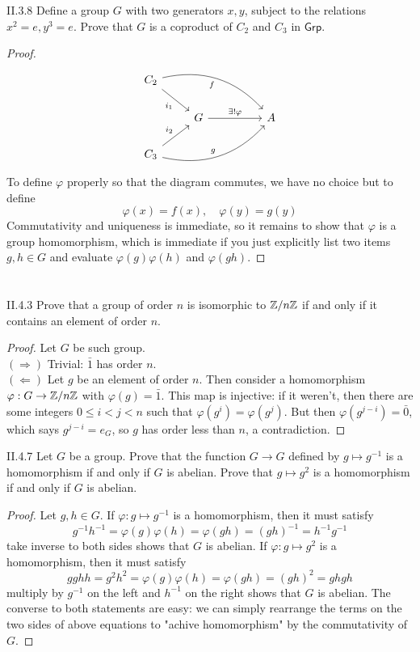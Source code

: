 \begin{problem}{II.3.8}
Define a group $G$ with two generators $x,y$, subject to the relations $x^2 = e, y^3 = e$. Prove that $G$ is a coproduct of $C_2$ and $C_3$ in $\mathsf{Grp}$.
\end{problem}
\begin{proof}
\[
\begin{tikzcd}
C_2 \arrow[rrrd, "f"', bend left] \arrow[rd, "i_1"'] &    &  &   \\
& G \arrow[rr, "\exists!\varphi"] &  & A \\
C_3 \arrow[rrru, "g", bend right] \arrow[ru, "i_2"]  &  &  &  
\end{tikzcd}
\]
To define $\varphi$ properly so that the diagram commutes, we have no choice but to define
\[
\varphi(x) = f(x), \quad \varphi(y) = g(y)
\]
Commutativity and uniqueness is immediate, so it remains to show that $\varphi$ is a group homomorphism, which is immediate if you just explicitly list two items $g,h \in G$ and evaluate $\varphi(g)\varphi(h)$ and $\varphi(gh)$.
\end{proof}

\section{}

\begin{problem}{II.4.3}
Prove that a group of order $n$ is isomorphic to $\mathbb{Z}/n\mathbb{Z}$ if and only if it contains an element of order $n$.
\end{problem}
\begin{proof}
Let $G$ be such group. \\
$(\Rightarrow)$ Trivial: $\bar{1}$ has order $n$. \\
$(\Leftarrow)$ Let $g$ be an element of order $n$. Then consider a homomorphism $\varphi: G \to \mathbb{Z}/n\mathbb{Z}$ with $\varphi(g) = \bar{1}$. This map is injective: if it weren't, then there are some integers $0 \leq i < j < n$ such that $\varphi(g^i) = \varphi(g^j)$. But then $\varphi(g^{j-i}) = \bar{0}$, which says $g^{j-i} = e_G$, so $g$ has order less than $n$, a contradiction.
\end{proof}

\begin{problem}{II.4.7}
Let $G$ be a group. Prove that the function $G \to G$ defined by $g \mapsto g^{-1}$ is a homomorphism if and only if $G$ is abelian. Prove that $g \mapsto g^2$ is a homomorphism if and only if $G$ is abelian.
\end{problem}
\begin{proof}
Let $g,h \in G$. If $\varphi: g \mapsto g^{-1}$ is a homomorphism, then it must satisfy
\[
g^{-1}h^{-1} = \varphi(g)\varphi(h) = \varphi(gh) = (gh)^{-1} = h^{-1}g^{-1}
\]
take inverse to both sides shows that $G$ is abelian. If $\varphi: g \mapsto g^{2}$ is a homomorphism, then it must satisfy
\[
gghh = g^{2}h^{2} = \varphi(g)\varphi(h) = \varphi(gh) = (gh)^2 = ghgh
\]
multiply by $g^{-1}$ on the left and $h^{-1}$ on the right shows that $G$ is abelian. The converse to both statements are easy: we can simply rearrange the terms on the two sides of above equations to "achive homomorphism" by the commutativity of $G$. 
\end{proof}


